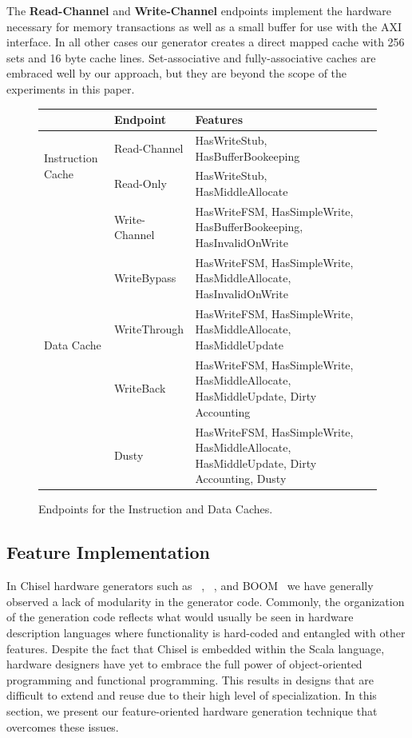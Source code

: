 \documentclass[conference]{IEEEtran}
\begin{document}
The \textbf{Read-Channel} and \textbf{Write-Channel} endpoints implement the hardware necessary for memory transactions as well as a small buffer for use with the AXI interface. In all other cases our generator creates a direct mapped cache with 256 sets and 16 byte cache lines. Set-associative and fully-associative caches are embraced well by our approach, but they are beyond the scope of the experiments in this paper.

\begin{figure}[ht]
    \centering
\scriptsize
\begin{tabular}{llll}\toprule
&Endpoint &Features \\\midrule
\multirow{2}{*}{Instruction Cache} &Read-Channel &HasWriteStub, HasBufferBookeeping \\
&Read-Only &HasWriteStub, HasMiddleAllocate \\\midrule
\multirow{5}{*}{Data Cache} &Write-Channel &HasWriteFSM, HasSimpleWrite, HasBufferBookeeping, HasInvalidOnWrite \\
&WriteBypass &HasWriteFSM, HasSimpleWrite, HasMiddleAllocate, HasInvalidOnWrite \\
&WriteThrough &HasWriteFSM, HasSimpleWrite, HasMiddleAllocate, HasMiddleUpdate \\
&WriteBack &HasWriteFSM, HasSimpleWrite, HasMiddleAllocate, HasMiddleUpdate, Dirty Accounting \\
&Dusty &HasWriteFSM, HasSimpleWrite, HasMiddleAllocate, HasMiddleUpdate, Dirty Accounting, Dusty \\
\bottomrule
\end{tabular}
    \caption{Endpoints for the Instruction and Data Caches.}
    \label{fig:Endpoints}
\end{figure}

\subsection{Feature Implementation}\label{sec:implementation}
In Chisel hardware generators such as \Riscvmini{}~\cite{RvMini}, \Rocketchip{}~\cite{chisel:riscv}, and BOOM~\cite{boom} we have generally observed a lack of modularity in the generator code. Commonly, the organization of the generation code reflects what would usually be seen in hardware description languages where functionality is hard-coded and entangled with other features. Despite the fact that Chisel is embedded within the Scala language, hardware designers have yet to embrace the full power of object-oriented programming and functional programming. This results in designs that are difficult to extend and reuse due to their high level of specialization. In this section, we present our feature-oriented hardware generation technique that overcomes these issues.
\end{document}
